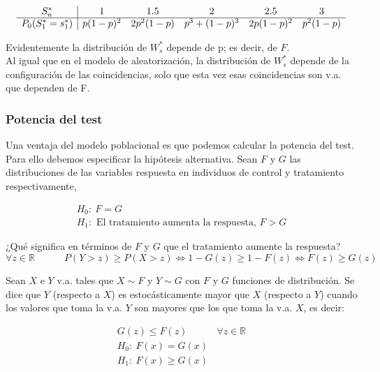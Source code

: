     $$
    \begin{array}{c|c c c c c}
        S^*_n & 1 & 1.5 & 2 & 2.5 & 3 \\ \hline 
        P_0(S^*_1=s^*_1) & p(1-p)^2 & 2p^2(1-p) & p^3+(1-p)^3 & 2p(1-p)^2 & p^2(1-p) \\
    \end{array}
    $$

Evidentemente la distribución de $W^*_s$ depende de p; es decir, de $F$.\\

Al igual que en el modelo de aleatorización, la distribución de $W^*_s$ depende de la configuración de las coincidencias, solo que esta vez esas coincidencias son v.a. que dependen de F.

\subsubsection{Potencia del test}
Una ventaja del modelo poblacional es que podemos calcular la potencia del test. Para ello debemos especificar la hipótesis alternativa. Sean $F$ y $G$ las distribuciones de las variables respuesta en individuos de control y tratamiento respectivamente,

$$
\begin{array}{c}
    H_0:\ F=G \\
    H_1:\text{ El tratamiento aumenta la respuesta, }F>G
\end{array}
$$

¿Qué significa en términos de $F$ y $G$ que el tratamiento aumente la respuesta?
$$
\forall z \in\mathbb{R}\quad\quad\quad P(Y>z)\geq P(X>z) \iff 1-G(z)\geq 1-F(z) \iff F(z)\geq G(z)
$$

\begin{theorem}
    Sean $X$ e $Y$ v.a. tales que $X\sim F$ y $Y\sim G$ con $F$ y $G$ funciones de distribución. Se dice que $Y$ (respecto a $X$) es estocásticamente mayor que $X$ (respecto a $Y$) cuando los valores que toma la v.a. $Y$ son mayores que los que toma la v.a. $X$, es decir:
    
    $$
    \begin{array}{c}
        G(z)\leq F(z)\quad\quad\quad\forall z \in\mathbb{R}\\
        H_0:\ F(x)=G(x)\\
        H_1:\ F(x)\geq G(x)
    \end{array}
    $$

\end{theorem}

